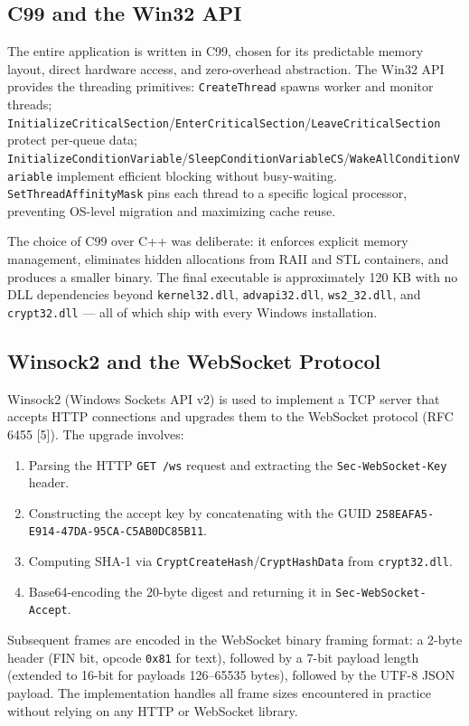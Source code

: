 \documentclass[12pt,a4paper]{article}
\begin{document}
\subsection{C99 and the Win32 API}

The entire application is written in C99, chosen for its predictable memory layout, direct hardware access, and zero-overhead abstraction. The Win32 API provides the threading primitives: \texttt{CreateThread} spawns worker and monitor threads; \texttt{InitializeCriticalSection}/\texttt{EnterCriticalSection}/\texttt{LeaveCriticalSection} protect per-queue data; \texttt{InitializeConditionVariable}/\texttt{SleepConditionVariableCS}/\texttt{WakeAllConditionVariable} implement efficient blocking without busy-waiting. \texttt{SetThreadAffinityMask} pins each thread to a specific logical processor, preventing OS-level migration and maximizing cache reuse.

The choice of C99 over C++ was deliberate: it enforces explicit memory management, eliminates hidden allocations from RAII and STL containers, and produces a smaller binary. The final executable is approximately 120 KB with no DLL dependencies beyond \texttt{kernel32.dll}, \texttt{advapi32.dll}, \texttt{ws2\_32.dll}, and \texttt{crypt32.dll} — all of which ship with every Windows installation.

\subsection{Winsock2 and the WebSocket Protocol}

Winsock2 (Windows Sockets API v2) is used to implement a TCP server that accepts HTTP connections and upgrades them to the WebSocket protocol (RFC 6455 [5]). The upgrade involves:
\begin{enumerate}
  \item Parsing the HTTP \texttt{GET /ws} request and extracting the \texttt{Sec-WebSocket-Key} header.
  \item Constructing the accept key by concatenating with the GUID \texttt{258EAFA5-E914-47DA-95CA-C5AB0DC85B11}.
  \item Computing SHA-1 via \texttt{CryptCreateHash}/\texttt{CryptHashData} from \texttt{crypt32.dll}.
  \item Base64-encoding the 20-byte digest and returning it in \texttt{Sec-WebSocket-Accept}.
\end{enumerate}
Subsequent frames are encoded in the WebSocket binary framing format: a 2-byte header (FIN bit, opcode \texttt{0x81} for text), followed by a 7-bit payload length (extended to 16-bit for payloads 126--65535 bytes), followed by the UTF-8 JSON payload. The implementation handles all frame sizes encountered in practice without relying on any HTTP or WebSocket library.
\end{document}
